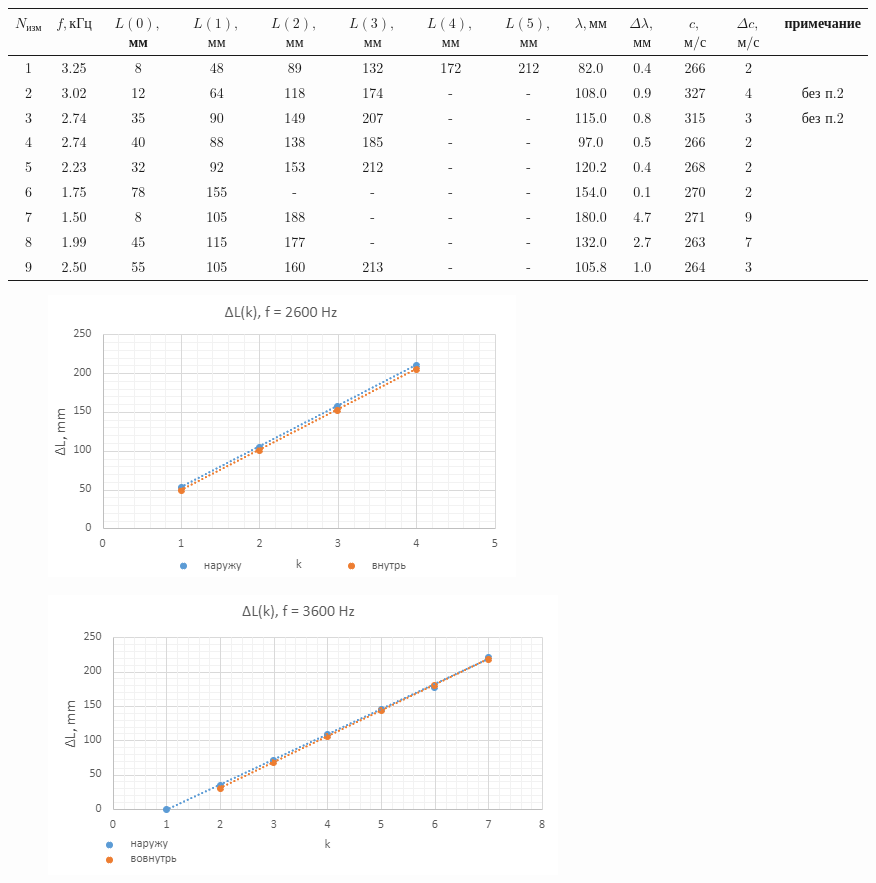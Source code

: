\documentclass[12pt,a4paper]{article}
\begin{document}
\begin{center}
\begin{tabular}{|c|c|c|c|c|c|c|c|c|c|c|c|c|}
\hline $N_\text{изм}$&$f, \text{кГц}$&$L(0),$ мм&$L(1),$ $\text{мм}$&$L(2),$ $\text{мм}$&$L(3),$ $\text{мм}$&$L(4),$ $\text{мм}$&$L(5),$ $\text{мм}$&$\lambda, \text{мм}$&$\Delta \lambda,$ $\text{мм}$&$c,$ $\text{м}/\text{с}$&$\Delta c,$ $\text{м}/\text{с}$&примечание\\\hline
1&3.25&8&48&89&132&172&212&82.0&0.4&266&2&\\ \hline
2&3.02&12&64&118&174&-&-&108.0&0.9&327&4&без п.2\\ \hline
3&2.74&35&90&149&207&-&-&115.0&0.8&315&3&без п.2\\ \hline
4&2.74&40&88&138&185&-&-&97.0&0.5&266&2&\\ \hline
5&2.23&32&92&153&212&-&-&120.2&0.4&268&2&\\ \hline
6&1.75&78&155&-&-&-&-&154.0&0.1&270&2&\\ \hline
7&1.50&8&105&188&-&-&-&180.0&4.7&271&9&\\ \hline
8&1.99&45&115&177&-&-&-&132.0&2.7&263&7&\\ \hline
9&2.50&55&105&160&213&-&-&105.8&1.0&264&3&\\ \hline
\end{tabular}
\end{center}
\begin{figure}[h]
    \centering
    \begin{center}
    \end{center}
    \includegraphics[width=10 cm]{coplot1.PNG}
    \label{fig:coplot1}
\end{figure}
\begin{figure}[h]
    \centering
    \begin{center}
    \end{center}
    \includegraphics[width=10 cm]{coplot2.PNG}
    \label{fig:coplot2}
\end{figure}
\end{document}
